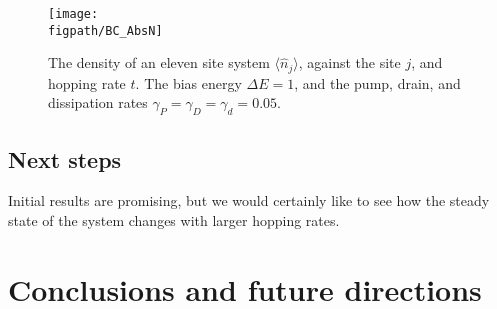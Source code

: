 \begin{figure}[ht!]
	\centering
	\texttt{[image: \\figpath/BC\_AbsN]}
	\caption{\label{fig:fw1-3}The density of an eleven site system \(\langle \hat{n}_{j} \rangle\), against the site \(j\), and hopping rate \(t\). The bias energy \(\Delta E = 1\), and the pump, drain, and dissipation rates \(\gamma_{P} = \gamma_{D} = \gamma_{d} = 0.05\).}
\end{figure}

\subsection{Next steps}
Initial results are promising, but we would certainly like to see how the steady state of the system changes with larger hopping rates.

\section{Conclusions and future directions} 